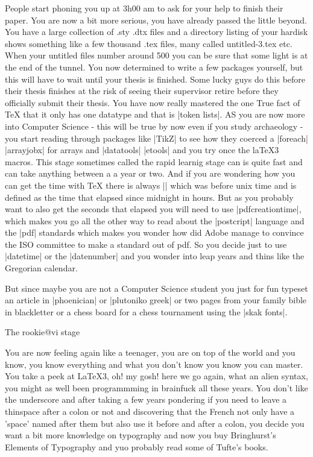 People start phoning you up at 3h00 am to ask for your help to finish their paper. You are now a bit more serious, you have already passed the little beyond. You have a large collection of .sty .dtx files and a directory listing of your hardisk shows something like a few thousand .tex files, many called untitled-3.tex etc. When your untitled files number around  500 you can be sure that some light is at the end of the tunnel. You now determined to write a few packages yourself, but this will have to wait until your thesis is finished. Some lucky guys do this before their thesis finishes at the risk of seeing their supervisor retire before they  officially submit their thesis. You have now really mastered the one True fact of TeX that it only has one datatype and that is |token lists|. AS you are now more into Computer Science - this will be true by now even if you study archaeology - you start reading through packages like |TikZ| to see how they coerced a |foreach| |arrayjobx| for arrays and |datatools| |etools| and you try once the laTeX3 macros. This stage sometimes called the rapid learnig stage can is quite fast and can take anything between a a year or two. And if you are wondering how you can get the time with TeX there is always |\time| which was before unix time and is defined as the time that elapsed since midnight in hours. But as you probably want to also get the seconds that elapsed you will need to use |pdfcreationtime|, which makes you go all the other way to read about the |postcript| language and the |pdf| standards which makes you wonder how did Adobe manage to convince the ISO committee to make a standard out of pdf. So you decide just to use |datetime| or the |datenumber| and you wonder into leap years and thins like the Gregorian calendar.

But since maybe you are not a Computer Science student you just for fun typeset an article in |phoenician| or |plutoniko greek| or two pages from your family bible in blackletter or a chess board for a chess tournament using the |skak fonts|.

The rookie@vi stage

You are now feeling again like a teenager, you are on top of the world and you know, you know everything and what you don't know you know you can master. You take a peek at LaTeX3, oh! my gosh! here we go again, what an alien syntax, you might as well been programmming in brainfuck all these years. You don't like the underscore and after taking a few years pondering if you need to leave a thinspace after a colon or not and discovering that the French not only have a 'space' named after them but also use it before and after a colon, you decide you want a bit more knowledge on typography and now you buy Bringhurst's  Elements of Typography and yuo probably read some of Tufte's books. 

